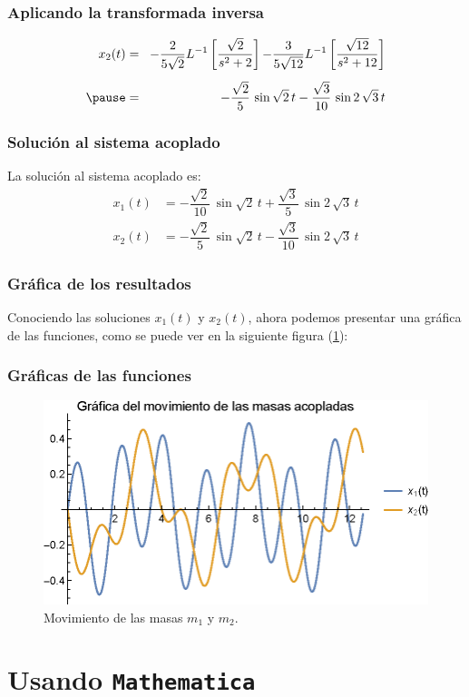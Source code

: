 \begin{frame}
\frametitle{Aplicando la transformada inversa}
\begin{eqnarray*}
x_{2}(t) &=& \! -\dfrac{2}{5 \sqrt{2}} L^{-1} \left[ \dfrac{\sqrt{2}}{s^{2} + 2} \right] {-} \dfrac{3}{5 \sqrt{12}} L^{-1} \left[ \dfrac{\sqrt{12}}{s^{2} + 12} \right] \\[0.5em] \pause
&=& - \dfrac{\sqrt{2}}{5} \, \sin \sqrt{2} \, t - \dfrac{\sqrt{3}}{10} \, \sin 2 \, \sqrt{3} \, t
\end{eqnarray*}
\end{frame}
\begin{frame}
\frametitle{Solución al sistema acoplado}
La solución al sistema acoplado es:
\begin{align*}
x_{1}(t) &= - \dfrac{\sqrt{2}}{10} \, \sin \sqrt{2} \, t + \dfrac{\sqrt{3}}{5} \, \sin 2 \, \sqrt{3} \, t \\[0.5em]
x_{2}(t) &= - \dfrac{\sqrt{2}}{5} \, \sin \sqrt{2} \, t - \dfrac{\sqrt{3}}{10} \, \sin 2 \, \sqrt{3} \, t
\end{align*}
\end{frame}
\begin{frame}
\frametitle{Gráfica de los resultados}
Conociendo las soluciones $x_{1}(t)$ y $x_{2}(t)$, ahora podemos presentar una gráfica de las funciones, como se puede ver en la siguiente figura (\ref{fig:plot_dos_masas_01}):
\end{frame}
\begin{frame}
\frametitle{Gráficas de las funciones}
\begin{figure}
    \centering
    \includegraphics[scale=1]{Imagenes/Ejercicio_masas_acopladas_01.eps}
    \caption{Movimiento de las masas $m_{1}$ y $m_{2}$.}
    \label{fig:plot_dos_masas_01}
\end{figure}
\end{frame}
\section{Usando \texttt{Mathematica}}
